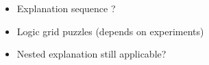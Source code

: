 \begin{itemize}
    \item Explanation sequence ?
    \item Logic grid puzzles (depends on experiments)
    \item Nested explanation still applicable?
\end{itemize}